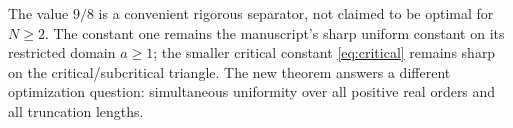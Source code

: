\begin{remark}
The value $9/8$ is a convenient rigorous separator, not claimed to be optimal for $N\ge2$. The constant one remains the manuscript's sharp uniform constant on its restricted domain $a\ge1$; the smaller critical constant \eqref{eq:critical} remains sharp on the critical/subcritical triangle. The new theorem answers a different optimization question: simultaneous uniformity over all positive real orders and all truncation lengths.
\end{remark}
